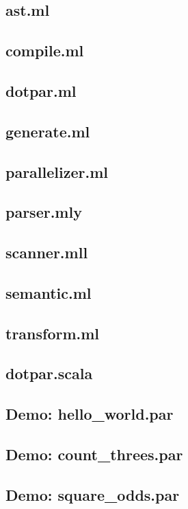 \documentclass[11pt]{article}
\begin{document}
\subsection{ast.ml}


\subsection{compile.ml}


\subsection{dotpar.ml}


\subsection{generate.ml}


\subsection{parallelizer.ml}


\subsection{parser.mly}


\subsection{scanner.mll}


\subsection{semantic.ml}


\subsection{transform.ml}


\subsection{dotpar.scala}


\subsection{Demo: hello\_world.par}


\subsection{Demo: count\_threes.par}


\subsection{Demo: square\_odds.par}

\end{document}
